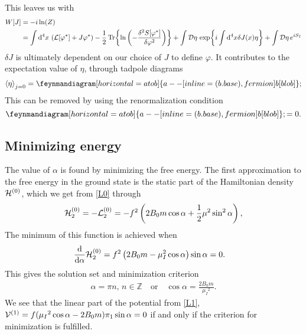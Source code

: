 This leaves us with 
\begin{align}
    \label{generating functional}
    W[J] 
    & = -i \ln(Z) \\
    & = 
    \int\dd^4 x \, \left(\mathcal{L}[\varphi^*] + J \varphi^*\right)
    - \frac{1}{2} \Tr{\ln\left( - \frac{\delta^2 S[\varphi^*]}{\delta \varphi^2} \right)}
    + \int \mathcal{D} \eta \, \exp{i \int \dd^4 x \delta J(x) \eta  }
    + \int \mathcal{D} \eta \, e^{iS_I}
\end{align}
$\delta J$ is ultimately dependent on our choice of $J$ to define $\varphi$.
It contributes to the expectation value of $\eta$, through tadpole diagrams
\begin{align}
    \ex{\eta}_{j=0} = 
    \feynmandiagram [horizontal=a to b]{
    a --[inline=(b.base), fermion] b[blob]
    }; 
\end{align}
This can be removed by using the renormalization condition
\begin{equation}
    \feynmandiagram [horizontal=a to b]{
    a --[inline=(b.base), fermion] b[blob]
    };
    = 0.
\end{equation}


\subsection{Minimizing energy}
The value of $\alpha$ is found by minimizing the free energy. 
The first approximation to the free energy in the ground state is the static part of the Hamiltonian density $\mathcal{H}^{(0)}$, which we get from \autoref{L0} through
\begin{equation}
    \mathcal{H}_2^{(0)} = - \mathcal{L}_2^{(0)} = 
    -f^2   
    \left(
        2B_0m \cos{\alpha}
        + \frac{1}{2} \mu^2 \sin^2{\alpha}
    \right),
\end{equation}
The minimum of this function is achieved when
\begin{align*}
    &\dv{\alpha} \mathcal{H}_2^{(0)} 
    = f^2\left(2B_0m - \mu_I^2\cos{\alpha}\right)\sin{\alpha}
    = 0.
\end{align*}
This gives the solution set and minimization criterion
\begin{align}
    \alpha = \pi n, \, n \in \mathbb{Z} \quad
    \mathrm{or} \quad
    \cos{\alpha} = \frac{2B_0m}{\mu_I{}^2}.
\end{align}
We see that the linear part of the potential from \autoref{L1}, $\mathcal{V}^{(1)} = f(\mu_I{}^2\cos{\alpha} - 2B_0m)\pi_1 \sin{\alpha}= 0$ if and only if the criterion for minimization is fulfilled.

